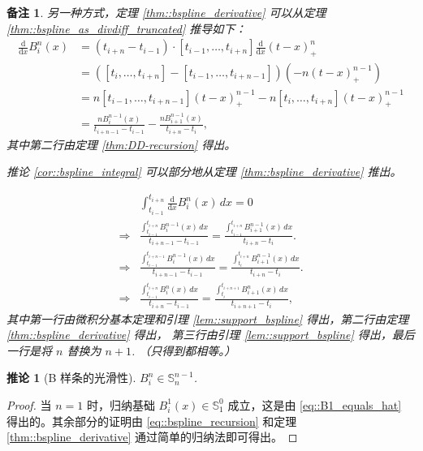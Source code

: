\documentclass[a4paper]{ctexart}
\newtheorem{remark}{备注}
\newtheorem{corollary}[theorem]{推论}
\numberwithin{theorem}{section}
\numberwithin{equation}{section}
\numberwithin{figure}{section}
\numberwithin{remark}{section}
\begin{document}
\begin{remark}
另一种方式，定理 \ref{thm::bspline_derivative} 可以从定理 \ref{thm::bspline_as_divdiff_truncated} 推导如下：
\begin{align*}
\frac{\mathrm{d}}{\mathrm{d}x} B_i^n(x) &= (t_{i+n} - t_{i-1}) \cdot [t_{i-1}, \ldots, t_{i+n}] \frac{\mathrm{d}}{\mathrm{d}x} (t - x)_+^n \\
&= ([t_i, \ldots, t_{i+n}] - [t_{i-1}, \ldots, t_{i+n-1}]) (-n (t - x)_+^{n-1}) \\
&= n [t_{i-1}, \ldots, t_{i+n-1}] (t - x)_+^{n-1} - n [t_i, \ldots, t_{i+n}] (t - x)_+^{n-1} \\
&= \frac{n B_i^{n-1}(x)}{t_{i+n-1} - t_{i-1}} - \frac{n B_{i+1}^{n-1}(x)}{t_{i+n} - t_i},
\end{align*}
其中第二行由定理 \ref{thm:DD-recursion} 得出。

推论 \ref{cor::bspline_integral} 可以部分地从定理 \ref{thm::bspline_derivative} 推出。

\[
\begin{aligned}
& \int_{t_{i-1}}^{t_{i+n}} \frac{\mathrm{d}}{\mathrm{d}x} B_i^n(x) \, dx = 0 \\
\Rightarrow & \frac{\displaystyle \int_{t_{i-1}}^{t_{i+n}} B_i^{n-1}(x) \, dx}{t_{i+n-1} - t_{i-1}} = \frac{\displaystyle \int_{t_{i-1}}^{t_{i+n}} B_{i+1}^{n-1}(x) \, dx}{t_{i+n} - t_i}. \\
\Rightarrow & \frac{\displaystyle \int_{t_{i-1}}^{t_{i+n-1}} B_i^{n-1}(x) \, dx}{t_{i+n-1} - t_{i-1}} = \frac{\displaystyle \int_{t_i}^{t_{i+n}} B_{i+1}^{n-1}(x) \, dx}{t_{i+n} - t_i}. \\
\Rightarrow & \frac{\displaystyle \int_{t_{i-1}}^{t_{i+n}} B_i^n(x) \, dx}{t_{i+n} - t_{i-1}} = \frac{\displaystyle \int_{t_i}^{t_{i+n+1}} B_{i+1}^n(x) \, dx}{t_{i+n+1} - t_i},
\end{aligned}
\]
其中第一行由微积分基本定理和引理 \ref{lem::support_bspline} 得出，第二行由定理 \ref{thm::bspline_derivative} 得出，
第三行由引理 \ref{lem::support_bspline} 得出，最后一行是将 $n$ 替换为 $n+1$.  （只得到都相等。）  
\end{remark}

\begin{corollary}[B 样条的光滑性]
    \label{cor::bspline_higher_derivative}
    $B_i^n \in \mathbb{S}_n^{n-1}$.
\end{corollary}

\begin{proof}
当 $n=1$ 时，归纳基础 $B_i^1(x) \in \mathbb{S}_1^0$ 成立，这是由 \eqref{eq::B1_equals_hat} 得出的。其余部分的证明由 \eqref{eq::bspline_recursion} 
和定理 \ref{thm::bspline_derivative} 通过简单的归纳法即可得出。
\end{proof}
\end{document}
